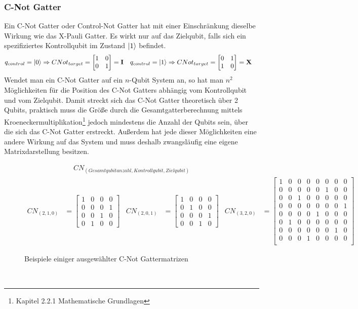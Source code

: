 \documentclass[12pt]{report}
\begin{document}
\subsubsection{C-Not Gatter}			%
Ein C-Not Gatter oder Control-Not Gatter hat mit einer Einschränkung dieselbe Wirkung wie das X-Pauli Gatter. Es wirkt nur auf das Zielqubit, falls sich ein spezifiziertes Kontrollqubit im Zustand $\ket{1}$ befindet.
\begin{align*}
	q_{control}=\ket{0} &\Rightarrow CNot_{target}=\begin{bmatrix} 1&0\\0&1 \end{bmatrix}=\text{\textbf{I}} & q_{control}=\ket{1} &\Rightarrow CNot_{target}=\begin{bmatrix} 0&1\\1&0 \end{bmatrix}=\text{\textbf{X}}
\end{align*}
Wendet man ein C-Not Gatter auf ein $n$-Qubit System an, so hat man $n^2$ Möglichkeiten für die Position des C-Not Gatters abhängig vom Kontrollqubit und vom Zielqubit. Damit streckt sich das C-Not Gatter theoretisch über 2 Qubits, praktisch muss die Größe durch die Gesamtgatterberechnung mittels Kroeneckermultiplikation\footnote{Kapitel 2.2.1 Mathematische Grundlagen} jedoch mindestens die Anzahl der Qubits sein, über die sich das C-Not Gatter erstreckt. Außerdem hat jede dieser Möglichkeiten eine andere Wirkung auf das System und muss deshalb zwangsläufig eine eigene Matrixdarstellung besitzen.
\begin{figure}[h]
\begin{align*}
CN_{(Gesamtqubitanzahl, Kontrollqubit, Zielqubit)}
\end{align*}
\vspace{-1cm}
\begin{align*}
CN_{(2,1,0)} &= \left[\begin{smallmatrix} 1&0&0&0 \\0&0&0&1 \\0&0&1&0 \\0&1&0&0 \end{smallmatrix}\right] &
CN_{(2,0,1)} &= \left[\begin{smallmatrix} 1&0&0&0 \\0&1&0&0 \\0&0&0&1 \\0&0&1&0 \end{smallmatrix}\right] &
CN_{(3,2,0)} &= \left[\begin{smallmatrix} 
1&0&0&0&0&0&0&0\\
0&0&0&0&0&1&0&0\\
0&0&1&0&0&0&0&0\\
0&0&0&0&0&0&0&1\\
0&0&0&0&1&0&0&0\\
0&1&0&0&0&0&0&0\\
0&0&0&0&0&0&1&0\\
0&0&0&1&0&0&0&0\\
\end{smallmatrix}\right] &
\end{align*}
\caption{Beispiele einiger ausgewählter C-Not Gattermatrizen}
\end{figure}\\
\end{document}
